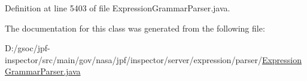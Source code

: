 Definition at line 5403 of file Expression\+Grammar\+Parser.\+java.



The documentation for this class was generated from the following file\+:\begin{DoxyCompactItemize}
\item 
D\+:/gsoc/jpf-\/inspector/src/main/gov/nasa/jpf/inspector/server/expression/parser/\hyperlink{_expression_grammar_parser_8java}{Expression\+Grammar\+Parser.\+java}\end{DoxyCompactItemize}
